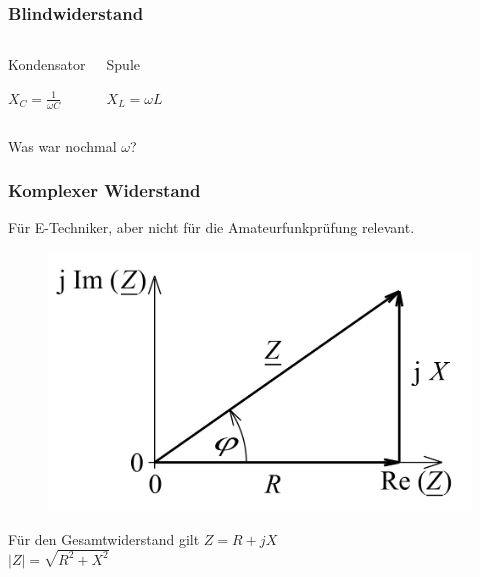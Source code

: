 \begin{frame}
  \frametitle{Blindwiderstand}
  \begin{columns}
    \begin{block}{Kondensator}
      \begin{center}
        \huge{$X_{C} = \frac{1}{\omega C}$}
      \end{center}
    \end{block}

    \begin{block}{Spule}
      \begin{center}
        \huge{$X_{L} = \omega L$}
      \end{center}
    \end{block}
  \end{columns}

  \begin{center}
    \vspace{1cm}
    Was war nochmal $\omega$? \\
  \end{center}
\end{frame}

\begin{frame}
  \frametitle{Komplexer Widerstand}
  Für E-Techniker, aber nicht für die Amateurfunkprüfung relevant.
  \begin{center}
    \begin{figure}
      \includegraphics[width=.8\textwidth,height=.4\textheight,keepaspectratio]{a03/Widerstand_Zeiger.png}
    \end{figure}
    \begin{block}{Für den Gesamtwiderstand gilt}
      $Z = R + jX$ \\
      $|Z| = \sqrt{R^2 + X^2}$
    \end{block}
  \end{center}
\end{frame}

